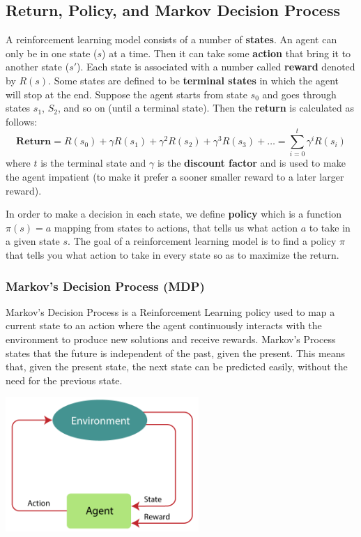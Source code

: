 \documentclass[a4paper, 12pt]{book}
\begin{document}
\subsection{Return, Policy, and Markov Decision Process}

A reinforcement learning model consists of a number of \textbf{states}. An agent can only be in one state ($s$) at a time. Then it can take some \textbf{action} that bring it to another state ($s'$). Each state is associated with a number called \textbf{reward} denoted by $R(s)$. Some states are defined to be \textbf{terminal states} in which the agent will stop at the end. Suppose the agent starts from state $s_0$ and goes through states $s_1$, $S_2$, and so on (until a terminal state). Then the \textbf{return} is calculated as follows:
\[\textbf{Return} = R(s_0) + \gamma R(s_1) + \gamma^2 R(s_2) + \gamma^3 R(s_3) + \dots = \sum_{i=0}^{t} \gamma^i R(s_i)\]
where $t$ is the terminal state and $\gamma$ is the \textbf{discount factor} and is used to make the agent impatient (to make it prefer a sooner smaller reward to a later larger reward).

In order to make a decision in each state, we define \textbf{policy} which is a function $\pi(s) = a$ mapping from states to actions, that tells us what action $a$ to take in a given state $s$. The goal of a reinforcement learning model is to find a policy $\pi$ that tells you what action to take in every state so as to maximize the return.

\subsubsection{Markov's Decision Process (MDP)}

Markov’s Decision Process is a Reinforcement Learning policy used to map a current state to an action where the agent continuously interacts with the environment to produce new solutions and receive rewards. Markov’s Process states that the future is independent of the past, given the present. This means that, given the present state, the next state can be predicted easily, without the need for the previous state.
\begin{center}
    \includegraphics[width=0.55\textwidth]{graphics/MDP.png}
\end{center}
\end{document}
